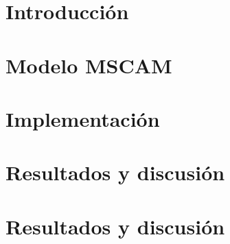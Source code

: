 \documentclass[11pt,a4paper]{article}
\begin{document}



\section{Introducción}
\label{sec:introduction}


\section{Modelo MSCAM}
\label{sec:model}


\section{Implementación}
\label{sec:impl}


\section{Resultados y discusión}
\label{sec:results}


\section{Resultados y discusión}
\label{sec:conclusions}

\end{document}
